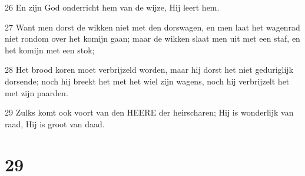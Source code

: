 \par 26 En zijn God onderricht hem van de wijze, Hij leert hem.
\par 27 Want men dorst de wikken niet met den dorswagen, en men laat het wagenrad niet rondom over het komijn gaan; maar de wikken slaat men uit met een staf, en het komijn met een stok;
\par 28 Het brood koren moet verbrijzeld worden, maar hij dorst het niet geduriglijk dorsende; noch hij breekt het met het wiel zijn wagens, noch hij verbrijzelt het met zijn paarden.
\par 29 Zulks komt ook voort van den HEERE der heirscharen; Hij is wonderlijk van raad, Hij is groot van daad.

\chapter{29}

